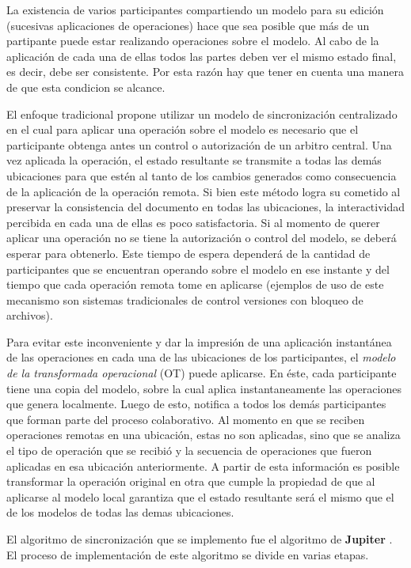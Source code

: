 \documentclass[12pt,a4paper]{article}
\begin{document}
	La existencia de varios participantes compartiendo un modelo para su edición (sucesivas aplicaciones de
	operaciones) hace que sea posible que más de un partipante puede estar realizando operaciones sobre el modelo.
	Al cabo de la aplicación de cada una de ellas todos las partes deben ver el mismo estado final, es decir,
	debe ser consistente. Por esta razón hay que tener en cuenta una manera de que esta condicion se alcance.

	El enfoque tradicional propone utilizar un modelo de sincronización centralizado en el cual para aplicar una
	operación sobre el modelo es necesario que el participante obtenga antes un control o autorización de un
	arbitro central. Una vez aplicada la operación, el estado resultante se transmite a todas las demás ubicaciones
	para que estén al tanto de los cambios generados como consecuencia de la aplicación de la operación remota.
	Si bien este método logra su cometido al preservar la consistencia del documento en todas las ubicaciones, la
	interactividad percibida en cada una de ellas es poco satisfactoria. Si al momento de querer aplicar una 
	operación no se tiene la autorización o control del modelo, se deberá esperar para obtenerlo. 
	Este tiempo de espera dependerá de la cantidad de participantes que se encuentran operando sobre el modelo
	en ese instante y del tiempo que cada operación remota tome en aplicarse (ejemplos de uso de este mecanismo
	son sistemas tradicionales de control versiones con bloqueo de archivos).

	Para evitar este inconveniente y dar la impresión de una aplicación instantánea de las operaciones en cada
	una de las ubicaciones de los participantes, el \textit{modelo de la transformada operacional} (OT) puede
	aplicarse. En éste, cada participante tiene una copia del modelo, sobre la cual aplica instantaneamente
	las operaciones que genera localmente. Luego de esto, notifica a todos los demás participantes que forman
	parte del proceso colaborativo.
	Al momento en que se reciben operaciones remotas en una ubicación, estas no son aplicadas, sino que se analiza
	el tipo de operación que se recibió y la secuencia de operaciones que fueron aplicadas en esa ubicación
	anteriormente. A partir de esta información es posible transformar la operación original en otra que cumple
	la propiedad de que al aplicarse al modelo local garantiza que el estado resultante será el mismo que el de
	los modelos de todas las demas ubicaciones.

	El algoritmo de sincronización que se implemento fue el algoritmo de \textbf{Jupiter} \cite{jupiter}. 
	El proceso de implementación de este algoritmo se divide en varias etapas.
	
\end{document}
